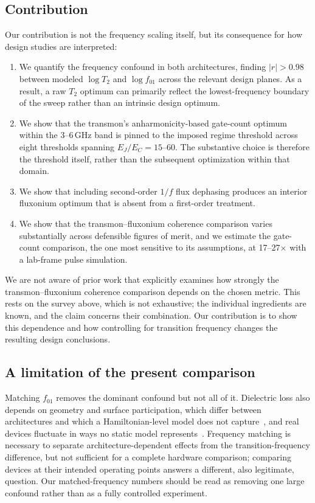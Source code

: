 \documentclass{SciPost}
\begin{document}
\subsection{Contribution}

Our contribution is not the frequency scaling itself, but its consequence for how design studies
are interpreted:

\begin{enumerate}
\item We quantify the frequency confound in both architectures, finding $|r|>0.98$ between modeled $\log T_2$ and $\log f_{01}$ across the relevant design planes. As a result, a raw
      $T_2$ optimum can primarily reflect the lowest-frequency boundary of the sweep rather than
      an intrinsic design optimum.
\item We show that the transmon's anharmonicity-based gate-count optimum within the 3--6\,GHz band is pinned to the
      imposed regime threshold across eight thresholds spanning $E_J/E_C=15$--$60$. The
      substantive choice is therefore the threshold itself, rather than the subsequent
      optimization within that domain.
\item We show that including second-order $1/f$ flux dephasing produces an interior fluxonium
      optimum that is absent from a first-order treatment.
\item We show that the transmon--fluxonium coherence comparison varies substantially across
      defensible figures of merit, and we estimate the gate-count comparison, the one most
      sensitive to its assumptions, at 17--27$\times$ with a lab-frame pulse simulation.
\end{enumerate}

We are not aware of prior work that explicitly examines how strongly the transmon--fluxonium
coherence comparison depends on the chosen metric. This rests on the survey above, which is
not exhaustive; the individual ingredients are known, and the claim concerns their combination.
Our contribution is to show this dependence
and how controlling for transition frequency changes the resulting design conclusions.

\subsection{A limitation of the present comparison}
\label{sec:matched-choice}

Matching $f_{01}$ removes the dominant confound but not all of it. Dielectric loss also depends
on geometry and surface participation, which differ between architectures and which a
Hamiltonian-level model does not capture~\cite{wang2015}, and real devices fluctuate in ways no
static model represents~\cite{mcrae2021}. Frequency matching is necessary to separate architecture-dependent effects from the
transition-frequency difference, but not sufficient for a complete hardware comparison;
comparing devices at their intended operating points answers a different, also legitimate,
question. Our matched-frequency numbers should be read as removing one large confound rather
than as a fully controlled experiment.
\end{document}
